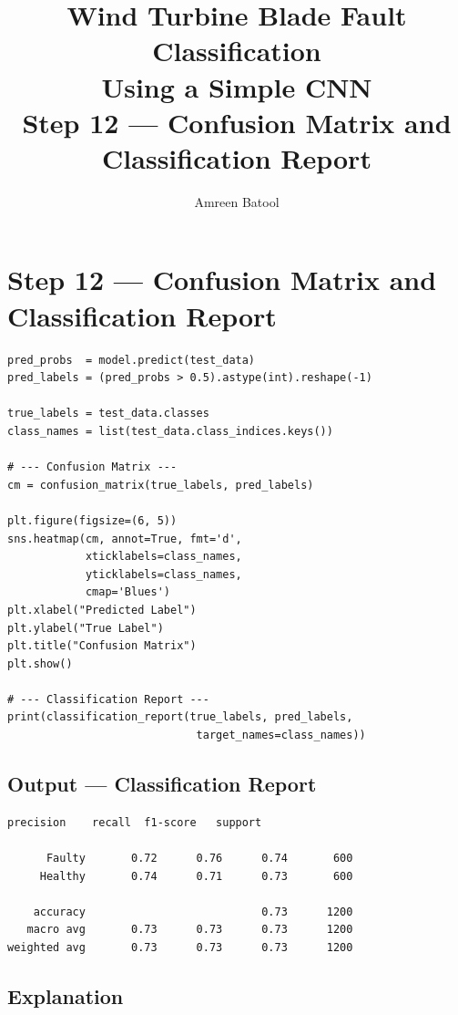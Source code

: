 \documentclass[12pt]{article}
\title{\textbf{Wind Turbine Blade Fault Classification\\Using a Simple CNN}\\[0.5em]
\large Step 12 --- Confusion Matrix and Classification Report}
\author{Amreen Batool}
\date{}
\begin{document}
\maketitle

\section*{Step 12 --- Confusion Matrix and Classification Report}

\begin{lstlisting}[style=pythonstyle]
pred_probs  = model.predict(test_data)
pred_labels = (pred_probs > 0.5).astype(int).reshape(-1)

true_labels = test_data.classes
class_names = list(test_data.class_indices.keys())

# --- Confusion Matrix ---
cm = confusion_matrix(true_labels, pred_labels)

plt.figure(figsize=(6, 5))
sns.heatmap(cm, annot=True, fmt='d',
            xticklabels=class_names,
            yticklabels=class_names,
            cmap='Blues')
plt.xlabel("Predicted Label")
plt.ylabel("True Label")
plt.title("Confusion Matrix")
plt.show()

# --- Classification Report ---
print(classification_report(true_labels, pred_labels,
                             target_names=class_names))
\end{lstlisting}

\subsection*{Output --- Classification Report}

\begin{lstlisting}[style=outputstyle]
              precision    recall  f1-score   support

      Faulty       0.72      0.76      0.74       600
     Healthy       0.74      0.71      0.73       600

    accuracy                           0.73      1200
   macro avg       0.73      0.73      0.73      1200
weighted avg       0.73      0.73      0.73      1200
\end{lstlisting}

\subsection*{Explanation}
\end{document}
